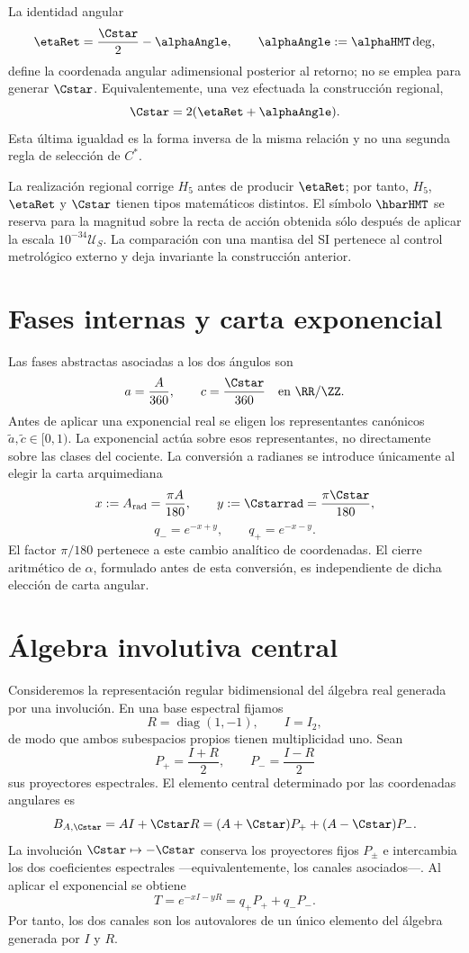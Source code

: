 La
identidad angular
\[
 \etaRet=\frac{\Cstar}{2}-\alphaAngle,
 \qquad
 \alphaAngle:=\alphaHMT\,{\rm deg},
\]
define la coordenada angular adimensional posterior al retorno; no se emplea
para generar \(\Cstar\). Equivalentemente,
una vez efectuada la construcción regional,
\[
 \Cstar=2(\etaRet+\alphaAngle).
\]
Esta última igualdad es la forma inversa de la misma relación y no una
segunda regla de selección de \(C^*\).

La realización regional corrige \(H_5\) antes de producir \(\etaRet\); por
tanto, \(H_5\),
\(\etaRet\) y \(\Cstar\) tienen tipos matemáticos distintos. El símbolo
\(\hbarHMT\) se reserva para la magnitud sobre la recta de acción obtenida
sólo después de aplicar la escala \(10^{-34}\mathcal U_S\). La comparación
con una mantisa del SI pertenece al control metrológico externo y deja
invariante la construcción anterior.

\section{Fases internas y carta exponencial}

Las fases abstractas asociadas a los dos ángulos son
\[
 a=\frac A{360},\qquad c=\frac{\Cstar}{360}
 \quad\text{en }\RR/\ZZ.
\]
Antes de aplicar una exponencial real se eligen los representantes canónicos
\(\widetilde a,\widetilde c\in[0,1)\). La exponencial actúa sobre esos
representantes, no directamente sobre las clases del cociente.
La conversión a radianes se introduce únicamente al elegir la carta
arquimediana
\[
 x:=A_{\rm rad}=\frac{\pi A}{180},\qquad
 y:=\Cstarrad=\frac{\pi\Cstar}{180},
\]
\[
 q_-=e^{-x+y},\qquad q_+=e^{-x-y}.
\]
El factor \(\pi/180\) pertenece a este cambio analítico de coordenadas. El
cierre aritmético de \(\alpha\), formulado antes de esta conversión, es
independiente de dicha elección de carta angular.

\section{Álgebra involutiva central}

Consideremos la representación regular bidimensional del álgebra real
generada por una involución. En una base espectral fijamos
\[
 R=\operatorname{diag}(1,-1),\qquad I=I_2,
\]
de modo que ambos subespacios propios tienen multiplicidad uno. Sean
\[
 P_+=\frac{I+R}{2},\qquad P_-=\frac{I-R}{2}
\]
sus proyectores espectrales. El elemento central determinado por las
coordenadas angulares es
\[
 B_{A,\Cstar}=AI+\Cstar R
 =(A+\Cstar)P_++(A-\Cstar)P_-.
\]
La involución \(\Cstar\mapsto-\Cstar\) conserva los proyectores fijos
\(P_\pm\) e intercambia los dos coeficientes espectrales ---equivalentemente,
los canales asociados---. Al aplicar el exponencial se obtiene
\[
 T=e^{-xI-yR}=q_+P_++q_-P_-.
\]
Por tanto, los dos canales son los autovalores de un único elemento del
álgebra generada por \(I\) y \(R\).

